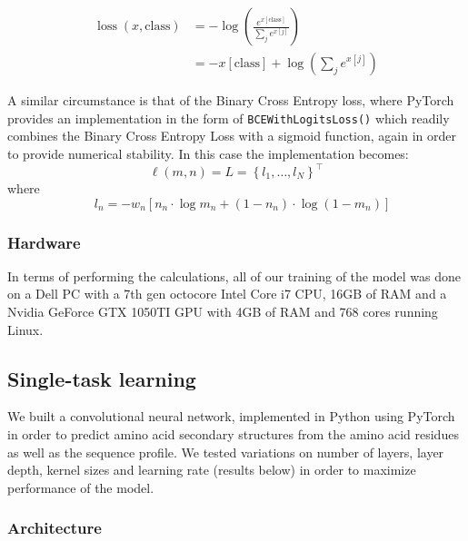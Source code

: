 \begin{multicols}{2}
\begin{align*}
\operatorname{loss}(x, \text {class})&=-\log \left(\frac{e^{ x[\text {class}]}}{\sum_{j} e^{ x[j]}}\right)\\
&=-x[\text {class}]+\log \left(\sum_{j} e^{x[j]}\right)
\end{align*}

\noindent A similar circumstance is that of the Binary Cross Entropy loss, where PyTorch provides an implementation in the form of \texttt{BCEWithLogitsLoss()} which readily combines the Binary Cross Entropy Loss with a sigmoid function, again in order to provide numerical stability. In this case the implementation becomes: \\
\[
\ell(m, n)=L=\left\{l_{1}, \ldots, l_{N}\right\}^{\top}
\]
where
\[ \quad l_{n}=-w_{n}\left[n_{n} \cdot \log m_{n}+\left(1-n_{n}\right) \cdot \log \left(1-m_{n}\right)\right]
\]

\subsubsection{Hardware}
In terms of performing the calculations, all of our training of the model was done on a Dell PC with a 7th gen octocore Intel Core i7 CPU, 16GB of RAM and a Nvidia GeForce GTX 1050TI GPU with 4GB of RAM and 768 cores running Linux.

\subsection{Single-task learning}
We built a convolutional neural network, implemented in Python using PyTorch in order to predict amino acid secondary structures from the amino acid residues as well as the sequence profile. We tested variations on number of layers, layer depth, kernel sizes and learning rate (results below) in order to maximize performance of the model. 

\subsubsection{Architecture}


\end{multicols}

